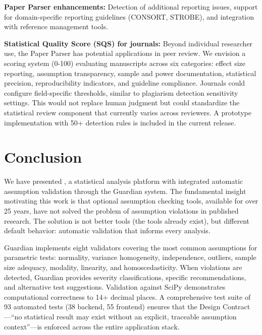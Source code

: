 \documentclass[article]{jss}
\begin{document}
\textbf{Paper Parser enhancements:} Detection of additional reporting issues, support for domain-specific reporting guidelines (CONSORT, STROBE), and integration with reference management tools.

\textbf{Statistical Quality Score (SQS) for journals:} Beyond individual researcher use, the Paper Parser has potential applications in peer review. We envision a scoring system (0-100) evaluating manuscripts across six categories: effect size reporting, assumption transparency, sample and power documentation, statistical precision, reproducibility indicators, and guideline compliance. Journals could configure field-specific thresholds, similar to plagiarism detection sensitivity settings. This would not replace human judgment but could standardize the statistical review component that currently varies across reviewers. A prototype implementation with 50+ detection rules is included in the current release.


\section{Conclusion} \label{sec:conclusion}

We have presented , a statistical analysis platform with integrated automatic assumption validation through the Guardian system. The fundamental insight motivating this work is that optional assumption checking tools, available for over 25 years, have not solved the problem of assumption violations in published research. The solution is not better tools (the tools already exist), but different default behavior: automatic validation that informs every analysis.

Guardian implements eight validators covering the most common assumptions for parametric tests: normality, variance homogeneity, independence, outliers, sample size adequacy, modality, linearity, and homoscedasticity. When violations are detected, Guardian provides severity classifications, specific recommendations, and alternative test suggestions. Validation against SciPy demonstrates computational correctness to 14+ decimal places. A comprehensive test suite of 93 automated tests (38 backend, 55 frontend) ensures that the Design Contract---``no statistical result may exist without an explicit, traceable assumption context''---is enforced across the entire application stack.
\end{document}
